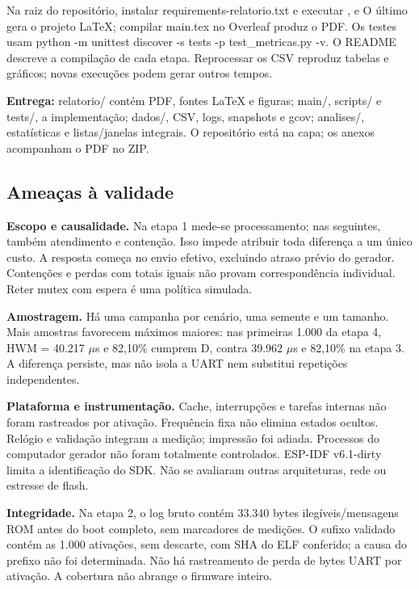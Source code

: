 Na raiz do repositório, instalar requirements-relatorio.txt e executar ,  e  O último gera o projeto LaTeX; compilar main.tex no Overleaf produz o PDF. Os testes usam python -m unittest discover -s tests -p test\_metricas.py -v. O README descreve a compilação de cada etapa. Reprocessar os CSV reproduz tabelas e gráficos; novas execuções podem gerar outros tempos.
\par

\textbf{Entrega:} relatorio/ contém PDF, fontes LaTeX e figuras; main/, scripts/ e tests/, a implementação; dados/, CSV, logs, snapshots e gcov; analises/, estatísticas e listas/janelas integrais. O repositório está na capa; os anexos acompanham o PDF no ZIP.
\par

\subsection{Ameaças à validade}

\textbf{Escopo e causalidade.} Na etapa 1 mede-se processamento; nas seguintes, também atendimento e contenção. Isso impede atribuir toda diferença a um único custo. A resposta começa no envio efetivo, excluindo atraso prévio do gerador. Contenções e perdas com totais iguais não provam correspondência individual. Reter mutex com espera é uma política simulada.
\par

\textbf{Amostragem.} Há uma campanha por cenário, uma semente e um tamanho. Mais amostras favorecem máximos maiores: nas primeiras 1.000 da etapa 4, HWM = 40.217 \ensuremath{\mu}s e 82,10\% cumprem D, contra 39.962 \ensuremath{\mu}s e 82,10\% na etapa 3. A diferença persiste, mas não isola a UART nem substitui repetições independentes.
\par

\textbf{Plataforma e instrumentação.} Cache, interrupções e tarefas internas não foram rastreados por ativação. Frequência fixa não elimina estados ocultos. Relógio e validação integram a medição; impressão foi adiada. Processos do computador gerador não foram totalmente controlados. ESP-IDF v6.1-dirty limita a identificação do SDK. Não se avaliaram outras arquiteturas, rede ou estresse de flash.
\par

\textbf{Integridade.} Na etapa 2, o log bruto contém 33.340 bytes ilegíveis/mensagens ROM antes do boot completo, sem marcadores de medições. O sufixo validado contém as 1.000 ativações, sem descarte, com SHA do ELF conferido; a causa do prefixo não foi determinada. Não há rastreamento de perda de bytes UART por ativação. A cobertura não abrange o firmware inteiro.
\par

